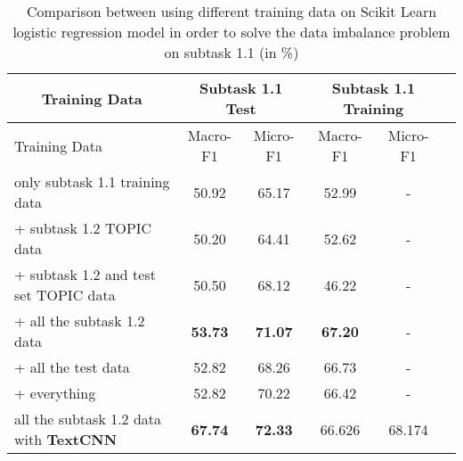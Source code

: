 \begin{table}[htbp!] %
    \begin{tabular}{lccccc}
    \toprule
        \multicolumn{1}{c}{Training Data}              & \multicolumn{2}{c}{Subtask 1.1 Test}  & \multicolumn{2}{c}{Subtask 1.1 Training} \\
    \midrule
        Training Data                                  & Macro-F1         & Micro-F1           & Macro-F1         & Micro-F1       \\
    \midrule
        only subtask 1.1 training data                 & 50.92            & 65.17              & 52.99            & -              \\
        + subtask 1.2 TOPIC data                       & 50.20            & 64.41              & 52.62            & -              \\
        + subtask 1.2 and test set TOPIC data          & 50.50            & 68.12              & 46.22            & -              \\
        + all the subtask 1.2 data                     & \bf53.73         & \bf71.07           & \bf67.20         & -              \\
        + all the test data                            & 52.82            & 68.26              & 66.73            & -              \\
        + everything                                   & 52.82            & 70.22              & 66.42            & -              \\
        all the subtask 1.2 data with \textbf{TextCNN} & \bf67.74         & \bf72.33           & 66.626           & 68.174         \\
    \bottomrule
    \end{tabular}
\caption{Comparison between using different training data on Scikit Learn logistic regression model in order to solve the data imbalance problem on subtask 1.1 (in \%)}
\label{tab:data_imbalance}
\end{table}
